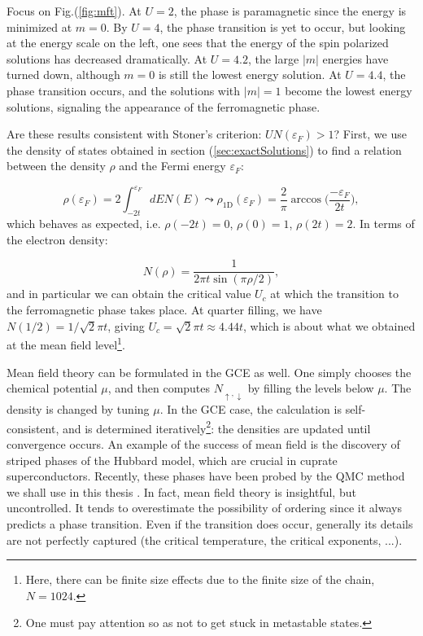 Focus on Fig.(\ref{fig:mft}).
At $U = 2$, the phase is paramagnetic since the energy is minimized at $m = 0$. By $U = 4$, the phase transition is yet to occur, but looking at the energy scale on the left, one sees that the energy of the spin polarized solutions has decreased dramatically.
	At $U = 4.2$, the large $| m | $ energies have turned down, although $m = 0$ is still the lowest energy solution.
	At $U = 4.4$, the phase transition occurs, and the solutions with $| m | = 1$ become the lowest energy solutions, signaling the appearance of the ferromagnetic phase.

Are these results consistent with Stoner's criterion: $U N ( \varepsilon_F ) > 1$?
First, we use the density of states obtained in section (\ref{sec:exactSolutions}) to find a relation between the density $\rho$ and the Fermi energy $\varepsilon_F$:

\begin{equation}
\rho ( \varepsilon_F ) = 2 \int_{-2t}^{\varepsilon_F} dE N ( E ) \leadsto \rho_{\text{1D}} ( \varepsilon_F ) = \frac{2}{\pi} \arccos\bigg( \frac{-\varepsilon_F}{2t}\bigg) ,
\end{equation}
which behaves as expected, i.e. $\rho ( -2 t ) = 0$,  $\rho ( 0 ) = 1$, $\rho ( 2 t ) = 2$.
In terms of the electron density:

\begin{equation}
N ( \rho ) = \frac{1}{2\pi t \sin(\pi \rho / 2)} ,
\end{equation}
and in particular we can obtain the critical value $U_c$ at which the transition to the ferromagnetic phase takes place.
At quarter filling, we have $N( 1 / 2 ) = 1 /\sqrt{2} \pi t$, giving $U_c = \sqrt{2} \pi t \approx 4.44 t$, which is about what we obtained at the mean field level\footnote{Here, there can be finite size effects due to the finite size of the chain, $N = 1024$.}.

Mean field theory can be formulated in the \ac{GCE} as well.
One simply chooses the chemical potential $\mu$, and then computes $N_{\uparrow, \downarrow}$ by filling the levels below $\mu$.
The density is changed by tuning $\mu$.
In the \ac{GCE} case, the calculation is self-consistent, and is determined iteratively\footnote{One must pay attention so as not to get stuck in metastable states.}: the densities are updated until convergence occurs.
An example of the success of mean field is the discovery of striped phases of the Hubbard model, which are crucial in cuprate superconductors.
Recently, these phases have been probed by the \ac{QMC} method we shall use in this thesis \cite{huang_stripe_2018}.
In fact, mean field theory is insightful, but uncontrolled.
It tends to overestimate the possibility of ordering since it always predicts a phase transition.
Even if the transition does occur, generally its details are not perfectly captured (the critical temperature, the critical exponents, ...).

